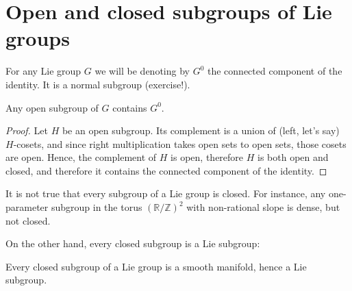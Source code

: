 \section{Open and closed subgroups of Lie groups}
\label{section-open-closed-subgroups}

For any Lie group $G$ we will be denoting by $G^0$ the connected component of the identity. It is a normal subgroup (exercise!). 

\begin{lemma}
\label{lemma-opensubgroup}
 Any open subgroup of $G$ contains $G^0$.
\end{lemma}

\begin{proof}
 Let $H$ be an open subgroup. Its complement is a union of (left, let's say) $H$-cosets, and since right multiplication takes open sets to open sets, those cosets are open. Hence, the complement of $H$ is open, therefore $H$ is both open and closed, and therefore it contains the connected component of the identity.
\end{proof}

It is not true that every subgroup of a Lie group is closed. For instance, any one-parameter subgroup in the torus $(\mathbb R/\mathbb Z)^2$ with non-rational slope is dense, but not closed.

On the other hand, every closed subgroup is a Lie subgroup:



\begin{theorem}[Cartan]
\label{theorem-Cartan}
 Every closed subgroup of a Lie group is a smooth manifold, hence a Lie subgroup.
\end{theorem}



